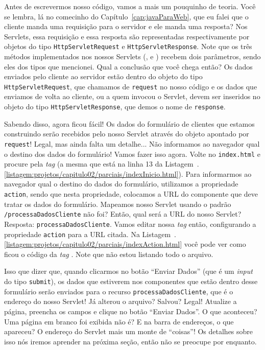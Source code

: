 Antes de escrevermos nosso código, vamos a mais um pouquinho de teoria. Você se lembra, lá no comecinho do Capítulo~\ref{cap:javaParaWeb}, que eu falei que o cliente manda uma requisição para o servidor e ele manda uma resposta? Nos Servlets, essa requisição e essa resposta são representadas respectivamente por objetos do tipo \texttt{HttpServletRequest} e \texttt{HttpServletResponse}. Note que os três métodos implementados nos nossos Servlets (,  e ) recebem dois parâmetros, sendo eles dos tipos que mencionei. Qual a conclusão que você chega então? Os dados enviados pelo cliente ao servidor estão dentro do objeto do tipo \texttt{HttpServletRequest}, que chamamos de \texttt{request} no nosso código e os dados que enviamos de volta ao cliente, ou a quem invocou o Servlet, devem ser inseridos no objeto do tipo \texttt{HttpServletResponse}, que demos o nome de \texttt{response}.

Sabendo disso, agora ficou fácil! Os dados do formulário de clientes que estamos construindo serão recebidos pelo nosso Servlet através do objeto apontado por \texttt{request}! Legal, mas ainda falta um detalhe... Não informamos ao navegador qual o destino dos dados do formulário! Vamos fazer isso agora. Volte no \texttt{index.html} e procure pela \textit{tag}  (a mesma que está na linha 13 da Listagem~\thechapter.\ref{listagem:projetos/capitulo02/parciais/indexInicio.html}). Para informarmos ao navegador qual o destino do dados do formulário, utilizamos a propriedade \texttt{action}, sendo que nesta propriedade, colocamos a URL do componente que deve tratar os dados do formulário. Mapeamos nosso Servlet usando o padrão \texttt{/processaDadosCliente} não foi? Então, qual será a URL do nosso Servlet? Resposta: \texttt{processaDadosCliente}. Vamos editar nossa \textit{tag}  então, configurando a propriedade \texttt{action} para a URL citada. Na Listagem~\thechapter.\ref{listagem:projetos/capitulo02/parciais/indexAction.html} você pode ver como ficou o código da \textit{tag} . Note que não estou listando todo o arquivo.


Isso que dizer que, quando clicarmos no botão ``Enviar Dados'' (que é um \textit{input} do tipo \texttt{submit}), os dados que estiverem nos componentes que estão dentro desse formulário serão enviados para o recurso \texttt{processaDadosCliente}, que é o endereço do nosso Servlet! Já alterou o arquivo? Salvou? Legal! Atualize a página, preencha os campos e clique no botão ``Enviar Dados''. O que aconteceu? Uma página em branco foi exibida não é? E na barra de endereços, o que apareceu? O endereço do Servlet mais um monte de ``coisas''! Os detalhes sobre isso nós iremos aprender na próxima seção, então não se preocupe por enquanto.

